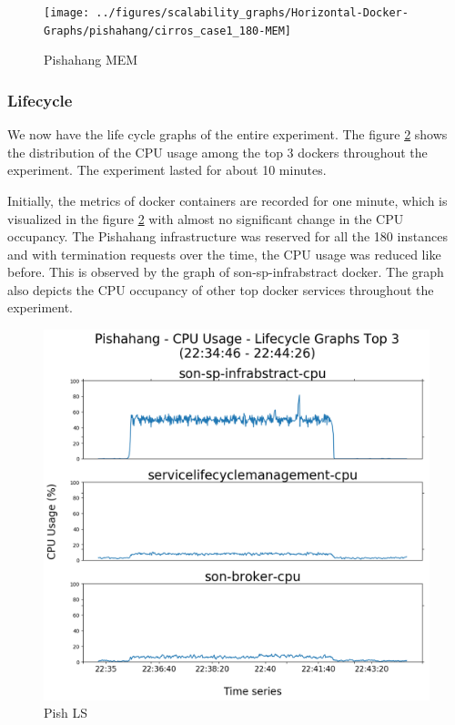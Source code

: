 \begin{figure}[h]
	\centering
	\texttt{[image: ../figures/scalability\_graphs/Horizontal-Docker-Graphs/pishahang/cirros\_case1\_180-MEM]}
	\caption{Pishahang MEM}
	\label{fig:pishcirroscase1180-mem}
\end{figure}
\pagebreak

\subsubsection{Lifecycle}

We now have the life cycle graphs of the entire experiment. The figure \ref{fig:pishahang-top-3-lifecycle} shows the distribution of the CPU usage among the top 3 dockers throughout the experiment. The experiment lasted for about 10 minutes.

Initially, the metrics of docker containers are recorded for one minute, which is visualized in  the figure \ref{fig:pishahang-top-3-lifecycle} with almost no significant change in the CPU occupancy. The Pishahang infrastructure was reserved for all the 180 instances and with termination requests over the time, the CPU usage was reduced like before. This is observed by the graph of son-sp-infrabstract docker. The graph also depicts the CPU occupancy of other top docker services throughout the experiment.


\begin{figure}[h]
	\centering
	\includegraphics[width=1\linewidth]{figures/scalability_graphs/Lifecycle-Graphs-Top-3/Pishahang-TOP-3-Lifecycle}
	\caption{Pish LS}
	\label{fig:pishahang-top-3-lifecycle}
\end{figure}
